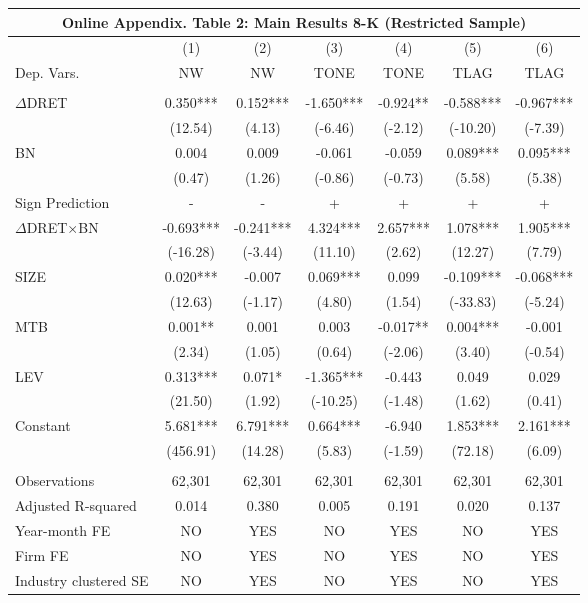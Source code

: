 \begin{table}[htbp] \label{oat2}
  \centering
    \begin{tabular}{lcccccc}
    \multicolumn{7}{c}{\textbf{Online Appendix. Table 2: Main Results 8-K (Restricted Sample)}} \\
    \midrule
      & (1) & (2) & (3) & (4) & (5) & (6) \\
    Dep. Vars. & NW & NW & TONE & TONE & TLAG & TLAG \\
    \midrule
      &   &   &   &   &   &  \\
    $\Delta$DRET & 0.350*** & 0.152*** & -1.650*** & -0.924** & -0.588*** & -0.967*** \\
    & (12.54) & (4.13) & (-6.46) & (-2.12) & (-10.20) & (-7.39) \\
    BN & 0.004 & 0.009 & -0.061 & -0.059 & 0.089*** & 0.095*** \\
    & (0.47) & (1.26) & (-0.86) & (-0.73) & (5.58) & (5.38) \\
    \rowcolor[rgb]{ .933,  .925,  .882} Sign Prediction & - & - & + & + & + & + \\
    \rowcolor[rgb]{ .933,  .925,  .882} $\Delta$DRET$\times$BN & -0.693*** & -0.241*** & 4.324*** & 2.657*** & 1.078*** & 1.905*** \\
    \rowcolor[rgb]{ .933,  .925,  .882}   & (-16.28) & (-3.44) & (11.10) & (2.62) & (12.27) & (7.79) \\
    SIZE & 0.020*** & -0.007 & 0.069*** & 0.099 & -0.109*** & -0.068*** \\
    & (12.63) & (-1.17) & (4.80) & (1.54) & (-33.83) & (-5.24) \\
    MTB & 0.001** & 0.001 & 0.003 & -0.017** & 0.004*** & -0.001 \\
    & (2.34) & (1.05) & (0.64) & (-2.06) & (3.40) & (-0.54) \\
    LEV & 0.313*** & 0.071* & -1.365*** & -0.443 & 0.049 & 0.029 \\
    & (21.50) & (1.92) & (-10.25) & (-1.48) & (1.62) & (0.41) \\
    Constant & 5.681*** & 6.791*** & 0.664*** & -6.940 & 1.853*** & 2.161*** \\
    & (456.91) & (14.28) & (5.83) & (-1.59) & (72.18) & (6.09) \\
    &   &   &   &   &   &  \\
    Observations & 62,301 & 62,301 & 62,301 & 62,301 & 62,301 & 62,301 \\
    Adjusted R-squared & 0.014 & 0.380 & 0.005 & 0.191 & 0.020 & 0.137 \\
    Year-month FE & NO & YES & NO & YES & NO & YES \\
    Firm FE & NO & YES & NO & YES & NO & YES \\
    Industry clustered SE & NO & YES & NO & YES & NO & YES \\
    \bottomrule
    \end{tabular}%
\end{table}%
